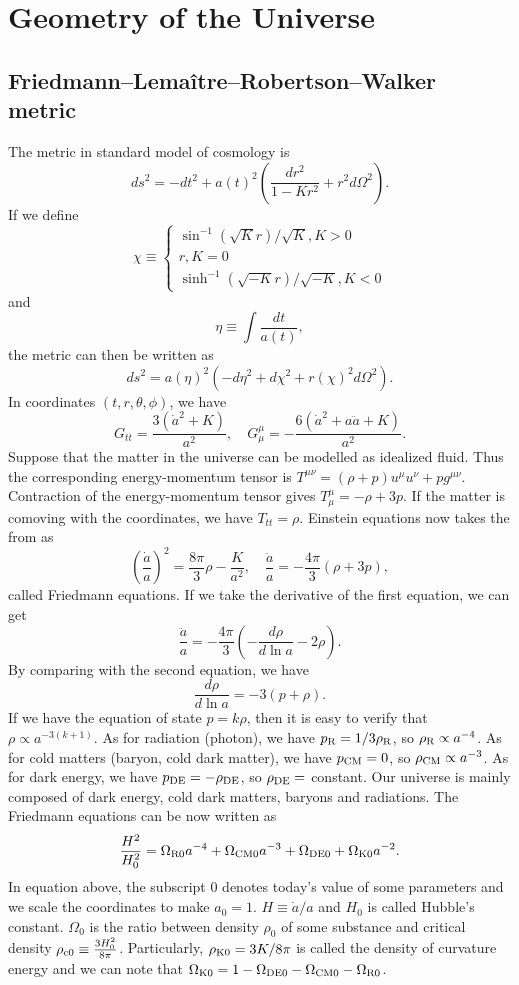 \chapter{Geometry of the Universe}
\section{Friedmann–Lemaître–Robertson–Walker metric}
The metric in standard model of cosmology is
\[ds^2 = -dt^2 + a(t)^2 \left(\frac{dr^2}{1-Kr^2} + r^2 d\Omega^2 \right).\]
If we define
\[\chi \equiv \begin{cases} 
\sin^{-1}(\sqrt{K}r)/\sqrt{K}, K > 0 \\
r, K = 0 \\
\sinh^{-1}(\sqrt{-K}r)/\sqrt{-K}, K < 0
\end{cases}\]
and
\[\eta \equiv \int \frac{dt}{a(t)},\]
the metric can then be written as
\[ds^2 =  a(\eta)^2 \left(-d\eta^2 + d\chi^2 + r(\chi)^2 d\Omega^2 \right).\]
In coordinates $(t,r,\theta,\phi)$, we have
\[G_{tt} = \frac{3(\dot{a}^2+K)}{a^2}, \quad G^{\mu}_{\mu} = -\frac{6(\dot{a}^2+a\ddot{a}+K)}{a^2}.\]  
Suppose that the matter in the universe can be modelled as idealized fluid. Thus the corresponding energy-momentum tensor is $T^{\mu\nu} = (\rho + p) u^{\mu} u^{\nu} + pg^{\mu\nu}$. Contraction of the energy-momentum tensor gives $T^{\mu}_{\mu} = -\rho + 3p$. 
If the matter is comoving with the coordinates, we have $T_{tt} = \rho$. Einstein equations now takes the from as
\[\left(\frac{\dot{a}}{a} \right)^2 = \frac{8\pi}{3}\rho - \frac{K}{a^2}, \quad \frac{\ddot{a}}{a} = - \frac{4\pi}{3}(\rho + 3p),\]
called Friedmann equations. If we take the derivative of the first equation, we can get
\[\frac{\ddot{a}}{a} = -\frac{4\pi}{3}\left( - \frac{d\rho}{d \ln a} -2\rho \right).\]
By comparing with the second equation, we have
\[\frac{d\rho}{d \ln a} = -3(p+\rho).\]
If we have the equation of state $p = k\rho$, then it is easy to verify that $\rho \propto a^{-3(k+1)}$.
As for radiation (photon), we have $p_{\rm R} = 1/3 \rho_{\rm R}$, so $\rho_{\rm R} \propto a^{-4}$. As for cold matters (baryon, cold dark matter), we have $p_{\rm CM} = 0$, so $\rho_{\rm CM} \propto a^{-3}$. As for dark energy, we have $p_{\rm DE} = - \rho_{\rm DE}$, so $\rho_{\rm DE} = $ constant. Our universe is mainly composed of dark energy, cold dark matters, baryons and radiations. 
The Friedmann equations can be now written as
\[\frac{H^2}{H_0^2} = \Omega_{\rm R0}a^{-4} + \Omega_{\rm CM0} a^{-3} + \Omega_{\rm DE0} + \Omega_{\rm K0}a^{-2}.\]
In equation above, the subscript $0$ denotes today's value of some parameters and we scale the coordinates to make $a_0 = 1$. 
$H \equiv \dot{a} / a$ and $H_0$ is called Hubble's constant. $\Omega_0$ is the ratio between density $\rho_0$ of some substance and critical density $\rho_{\rm c0} \equiv \frac{3H_0^2}{8\pi}$. Particularly, $\rho_{\rm K0} = 3K/8\pi$ is called the density of curvature energy and we can note that $\Omega_{\rm K0} = 1 - \Omega_{\rm DE0} - \Omega_{\rm CM0} - \Omega_{\rm R0}$.


